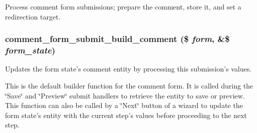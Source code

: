 \label{comment_8module_abb91789dc7f908120219fc645e7e1612}
Process comment form submissions; prepare the comment, store it, and set a redirection target. \hypertarget{comment_8module_abd5446f38e07ea95441adc78dbd3c968}{
\subsubsection[{comment\_\-form\_\-submit\_\-build\_\-comment}]{\setlength{\rightskip}{0pt plus 5cm}comment\_\-form\_\-submit\_\-build\_\-comment (\$ {\em form}, \/  \&\$ {\em form\_\-state})}}
\label{comment_8module_abd5446f38e07ea95441adc78dbd3c968}
Updates the form state's comment entity by processing this submission's values.

This is the default builder function for the comment form. It is called during the \char`\"{}Save\char`\"{} and \char`\"{}Preview\char`\"{} submit handlers to retrieve the entity to save or preview. This function can also be called by a \char`\"{}Next\char`\"{} button of a wizard to update the form state's entity with the current step's values before proceeding to the next step.

